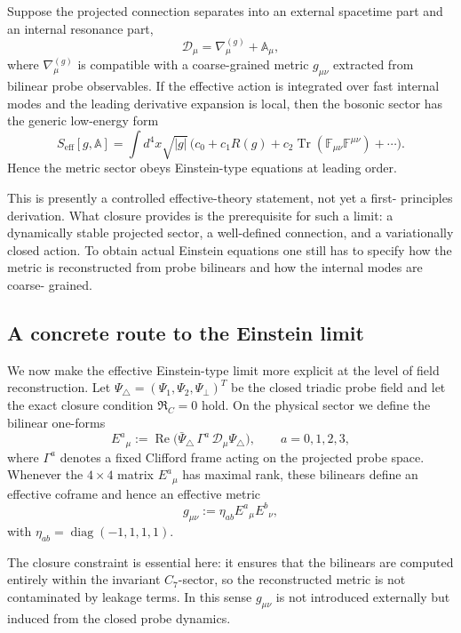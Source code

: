 \begin{proposition}
\label{prop:einstein-effective-limit}
Suppose the projected connection separates into an external spacetime part
and an internal resonance part,
\[
  \mathcal D_\mu = \nabla_\mu^{(g)} + \mathbb A_\mu,
\]
where $\nabla_\mu^{(g)}$ is compatible with a coarse-grained metric
$g_{\mu\nu}$ extracted from bilinear probe observables.
If the effective action is integrated over fast internal modes and the
leading derivative expansion is local, then the bosonic sector has the
generic low-energy form
\[
  S_{\mathrm{eff}}[g,\mathbb A]
  = \int d^4x\sqrt{|g|}\,
    \bigl(c_0 + c_1 R(g) + c_2\operatorname{Tr}(\mathbb F_{\mu\nu}\mathbb F^{\mu\nu}) + \cdots\bigr).
\]
Hence the metric sector obeys Einstein-type equations at leading order.
\end{proposition}

\begin{remark}
This is presently a controlled effective-theory statement, not yet a first-
principles derivation.
What closure provides is the prerequisite for such a limit: a dynamically
stable projected sector, a well-defined connection, and a variationally
closed action.
To obtain actual Einstein equations one still has to specify how the metric
is reconstructed from probe bilinears and how the internal modes are coarse-
grained.
\end{remark}


\subsection*{A concrete route to the Einstein limit}

We now make the effective Einstein-type limit more explicit at the level of
field reconstruction. Let $\Psi_\triangle=(\Psi_1,\Psi_2,\Psi_\perp)^T$ be the
closed triadic probe field and let the exact closure condition
$\mathfrak R_C=0$ hold. On the physical sector we define the bilinear one-forms
\[
  E^a{}_{\mu}
  := \operatorname{Re}\bigl(\bar\Psi_\triangle \,\Gamma^a \, \mathcal D_\mu
  \Psi_\triangle\bigr),
  \qquad a=0,1,2,3,
\]
where $\Gamma^a$ denotes a fixed Clifford frame acting on the projected probe
space. Whenever the $4\times 4$ matrix $E^a{}_{\mu}$ has maximal rank, these
bilinears define an effective coframe and hence an effective metric
\[
  g_{\mu\nu}
  := \eta_{ab} E^a{}_{\mu} E^b{}_{\nu},
\]
with $\eta_{ab}=\operatorname{diag}(-1,1,1,1)$.

The closure constraint is essential here: it ensures that the bilinears are
computed entirely within the invariant $C_7$-sector, so the reconstructed
metric is not contaminated by leakage terms. In this sense $g_{\mu\nu}$ is not
introduced externally but induced from the closed probe dynamics.

